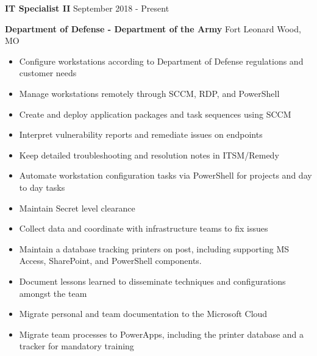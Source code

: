 \documentclass[../main.tex]{subfiles}
\begin{document}
    \textbf{IT Specialist II}
    \hfill
    September 2018 - Present
    
    \textbf{Department of Defense - Department of the Army}
    \hfill
    Fort Leonard Wood, MO
    \begin{itemize}
        \item Configure workstations according to Department of Defense regulations and customer needs
        \item Manage workstations remotely through SCCM, RDP, and PowerShell
        \item Create and deploy application packages and task sequences using SCCM
        \item Interpret vulnerability reports and remediate issues on endpoints
        \item Keep detailed troubleshooting and resolution notes in ITSM/Remedy
        \item Automate workstation configuration tasks via PowerShell for projects and day to day tasks
        \item Maintain Secret level clearance
        \item Collect data and coordinate with infrastructure teams to fix issues
        \item Maintain a database tracking printers on post, including supporting MS Access, SharePoint, and PowerShell components.
        \item Document lessons learned to disseminate techniques and configurations amongst the team
        \item Migrate personal and team documentation to the Microsoft Cloud
        \item Migrate team processes to PowerApps, including the printer database and a tracker for mandatory training
    \end{itemize}
\end{document}
